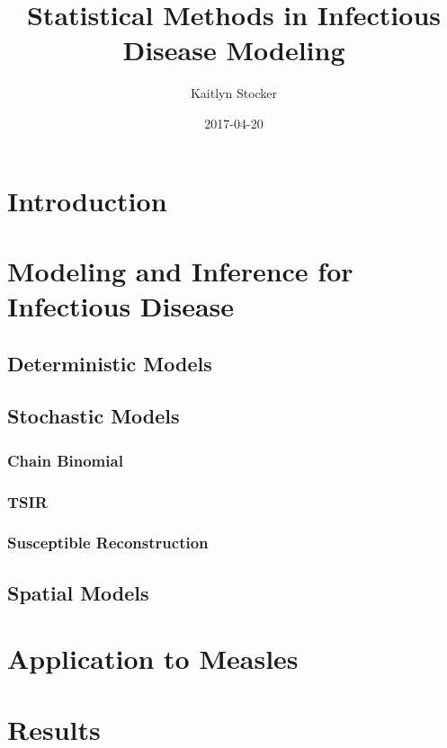 \documentclass{article}
\title{Statistical Methods in Infectious Disease Modeling}
\date{2017-04-20}
\author{Kaitlyn Stocker}
\begin{document}
\maketitle
{}
\newpage
{}
\tableofcontents


\section{Introduction}

\section{Modeling and Inference for Infectious Disease}
\subsection{Deterministic Models}
\subsection{Stochastic Models}
\subsubsection{Chain Binomial}
\subsubsection{TSIR}
\subsubsection{Susceptible Reconstruction}

\subsection{Spatial Models}

\section{Application to Measles}

\section{Results}
\end{document}
